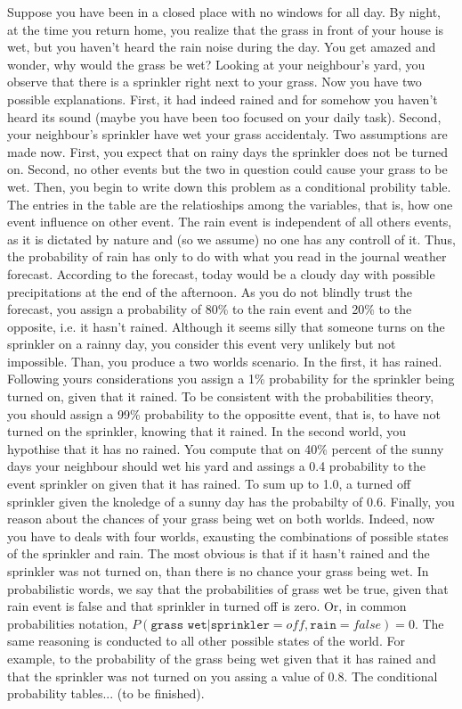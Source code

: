 \documentclass[10pt,a4paper]{report}
\begin{document}
Suppose you have been in a closed place with no windows for all day. By night, at the time you return home, you realize that the grass in front of your house is wet, but you haven't heard the rain noise during the day. You get amazed and wonder, why would the grass be wet? Looking at your neighbour's yard, you observe that there is a sprinkler right next to your grass. Now you have two possible explanations. First, it had indeed rained and for somehow you haven't heard its sound (maybe you have been too focused on your daily task). Second, your neighbour's sprinkler have wet your grass accidentaly. Two assumptions are made now. First, you expect that on rainy days the sprinkler does not be turned on. Second, no other events but the two in question could cause your grass to be wet. Then, you begin to write down this problem as a conditional probility table. The entries in the table are the relatioships among the variables, that is, how one event influence on other event. The rain event is independent of all others events, as it is dictated by nature and (so we assume) no one has any controll of it. Thus, the probability of rain has only to do with what you read in the journal weather forecast. According to the forecast, today would be a cloudy day with possible precipitations at the end of the afternoon. As you do not blindly trust the forecast, you assign a probability of 80\% to the rain event and 20\% to the opposite, i.e. it hasn't rained. Although it seems silly that someone turns on the sprinkler on a rainny day, you consider this event very unlikely but not impossible. Than, you produce a two worlds scenario. In the first, it has rained. Following yours considerations you assign a 1\% probability for the sprinkler being turned on, given that it rained. To be consistent with the probabilities theory, you should assign a 99\% probability to the oppositte event, that is, to have not turned on the sprinkler, knowing that it rained. In the second world, you hypothise that it has no rained. You compute that on 40\% percent of the sunny days your neighbour should wet his yard and assings a 0.4 probability to the event sprinkler on given that it has rained. To sum up to 1.0, a turned off sprinkler given the knoledge of a sunny day has the probabilty of 0.6. Finally, you reason about the chances of your grass being wet on both worlds. Indeed, now you have to deals with four worlds, exausting the combinations of possible states of the sprinkler and rain. The most obvious is that if it hasn't rained and the sprinkler was not turned on, than there is no chance your grass being wet. In probabilistic words, we say that the probabilities of grass wet be true, given that rain event is false and that sprinkler in turned off is zero. Or, in common probabilities notation, $P(\texttt{grass wet}|\texttt{sprinkler}={off}, \texttt{rain}=false)=0$. The same reasoning is conducted to all other possible states of the world. For example, to the probability of the grass being wet given that it has rained and that the sprinkler was not turned on you assing a value of 0.8. The conditional probability tables... (to be finished).
\end{document}
